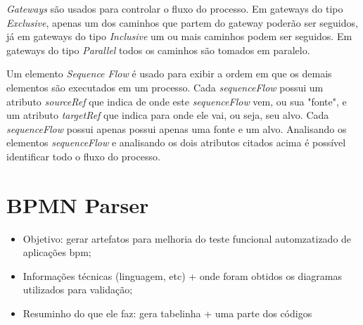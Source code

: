 \documentclass[12pt]{article}
\begin{document}
\emph{Gateways} são usados para controlar o fluxo do processo. Em gateways do tipo \emph{Exclusive}, apenas um dos caminhos que partem do gateway poderão ser seguidos, já em gateways do tipo \emph{Inclusive} um ou mais caminhos podem ser seguidos. Em gateways do tipo \emph{Parallel} todos os caminhos são tomados em paralelo.


Um elemento \emph{Sequence Flow} é usado para exibir a ordem em que os demais elementos são executados em um processo. Cada \emph{sequenceFlow} possui um atributo \emph{sourceRef} que indica de onde este \emph{sequenceFlow} vem, ou sua "fonte", e um atributo \emph{targetRef} que indica para onde ele vai, ou seja, seu alvo. Cada \emph{sequenceFlow} possui apenas possui apenas uma fonte e um alvo. Analisando os elementos \emph{sequenceFlow} e analisando os dois atributos citados acima é possível identificar todo o fluxo do processo.

\section{BPMN Parser}
\begin{itemize}
\item Objetivo: gerar artefatos para melhoria do teste funcional automzatizado de aplicações bpm;
\item Informações técnicas (linguagem, etc) + onde foram obtidos os diagramas utilizados para validação;
\item Resuminho do que ele faz: gera tabelinha + uma parte dos códigos
\end{itemize}

\end{document}

